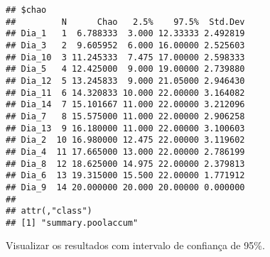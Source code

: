 \documentclass[
]{book}
\begin{document}
\begin{verbatim}
## $chao
##         N      Chao   2.5%    97.5%  Std.Dev
## Dia_1   1  6.788333  3.000 12.33333 2.492819
## Dia_3   2  9.605952  6.000 16.00000 2.525603
## Dia_10  3 11.245333  7.475 17.00000 2.598333
## Dia_5   4 12.425000  9.000 19.00000 2.739880
## Dia_12  5 13.245833  9.000 21.05000 2.946430
## Dia_11  6 14.320833 10.000 22.00000 3.164082
## Dia_14  7 15.101667 11.000 22.00000 3.212096
## Dia_7   8 15.575000 11.000 22.00000 2.906258
## Dia_13  9 16.180000 11.000 22.00000 3.100603
## Dia_2  10 16.980000 12.475 22.00000 3.119602
## Dia_4  11 17.665000 13.000 22.00000 2.786199
## Dia_8  12 18.625000 14.975 22.00000 2.379813
## Dia_6  13 19.315000 15.500 22.00000 1.771912
## Dia_9  14 20.000000 20.000 20.00000 0.000000
## 
## attr(,"class")
## [1] "summary.poolaccum"
\end{verbatim}

Visualizar os resultados com intervalo de confiança de 95\%.
\end{document}
